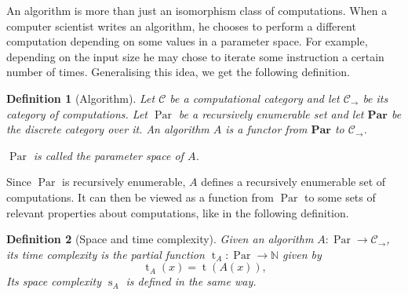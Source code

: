 \documentclass{article}
\newcommand{\cat}[1]{\mathscr{#1}}
\newcommand{\lcat}[1]{\mathbf{#1}}
\newcommand{\C}{\cat{C}}
\newcommand{\N}{\mathbb{N}}
\newcommand{\ra}{\rightarrow}
\DeclareMathOperator{\Time}{t}
\DeclareMathOperator{\Space}{s}
\DeclareMathOperator{\Par}{Par}
\newtheorem{definition}{Definition}
\begin{document}
  


  An algorithm is more than just an isomorphism class of
  computations. When a computer scientist writes an algorithm, he
  chooses to perform a different computation depending on some values
  in a parameter space. For example, depending on the input size he
  may chose to iterate some instruction a certain number of
  times. Generalising this idea, we get the following definition.

  \begin{definition}[Algorithm]
    Let $\C$ be a computational category and let $\C_\ra$ be its
    category of computations. Let $\Par$ be a recursively
    enumerable set and let $\lcat{Par}$ be the discrete category over
    it. An \emph{algorithm} $A$ is a functor from $\lcat{Par}$ to
    $\C_\ra$.

    $\Par$ is called the parameter space of $A$.
  \end{definition}

  Since $\Par$ is recursively enumerable, $A$ defines a recursively
  enumerable set of computations. It can then be viewed as a function
  from $\Par$ to some sets of relevant properties about computations,
  like in the following definition.

  \begin{definition}[Space and time complexity]
    Given an algorithm $A:\Par\ra\C_\ra$, its \emph{time complexity}
    is the partial function ${\Time_A:\Par\ra\N}$ given by
    \begin{equation*}
      \Time_A(x) = \Time(A(x)) \text{,}
    \end{equation*}
    Its \emph{space complexity} $\Space_A$ is defined in the same way.
  \end{definition}
\end{document}
